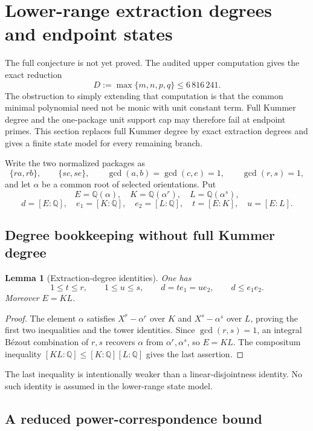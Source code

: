 \documentclass[11pt]{article}
\newtheorem{lemma}[theorem]{Lemma}
\theoremstyle{definition}
\newcommand{\Q}{\mathbb Q}
\begin{document}
\section{Lower-range extraction degrees and endpoint states}
\label{sec:lowerstates}

The full conjecture is not yet proved.  The audited upper computation gives
the exact reduction
\[
 D:=\max\{m,n,p,q\}\leq6\,816\,241.
\]
The obstruction to simply extending that computation is that the common
minimal polynomial need not be monic with unit constant term.  Full Kummer
degree and the one-package unit support cap may therefore fail at endpoint
primes.  This section replaces full Kummer degree by exact extraction
degrees and gives a finite state model for every remaining branch.

Write the two normalized packages as
\[
 \{ra,rb\},\qquad \{sc,se\},
 \qquad \gcd(a,b)=\gcd(c,e)=1,
 \qquad \gcd(r,s)=1,
\]
and let \(\alpha\) be a common root of selected orientations.  Put
\[
 E=\Q(\alpha),\quad K=\Q(\alpha^r),\quad L=\Q(\alpha^s),
\]
\[
 d=[E:\Q],\quad e_1=[K:\Q],\quad e_2=[L:\Q],
 \quad t=[E:K],\quad u=[E:L].
\]

\subsection{Degree bookkeeping without full Kummer degree}

\begin{lemma}[Extraction-degree identities]\label{lem:extractiondegrees}
One has
\begin{equation}
 1\leq t\leq r,\qquad 1\leq u\leq s,
 \qquad d=te_1=ue_2,
 \qquad d\leq e_1e_2.
 \tag{19.1}
\end{equation}
Moreover \(E=KL\).
\end{lemma}

\begin{proof}
The element \(\alpha\) satisfies \(X^r-\alpha^r\) over \(K\) and
\(X^s-\alpha^s\) over \(L\), proving the first two inequalities and the
tower identities.  Since \(\gcd(r,s)=1\), an integral B\'ezout combination
of \(r,s\) recovers \(\alpha\) from \(\alpha^r,\alpha^s\), so \(E=KL\).
The compositum inequality
\([KL:\Q]\leq[K:\Q][L:\Q]\) gives the last assertion.
\end{proof}

The last inequality is intentionally weaker than a linear-disjointness
identity.  No such identity is assumed in the lower-range state model.

\subsection{A reduced power-correspondence bound}
\end{document}

